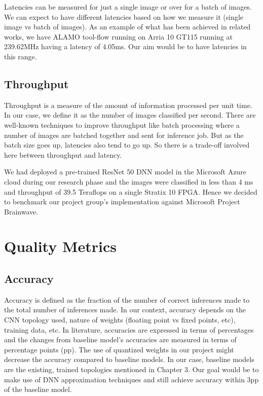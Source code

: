 \documentclass[titlepage]{report}
\begin{document}
Latencies can be measured for just a single image or over for a batch of images. We can expect to have different latencies based on how we measure it (single image vs batch of images). As an example of what has been achieved in related works, we have ALAMO tool-flow running on Arria 10 GT115 running at 239.62MHz having a latency of 4.05ms.
Our aim would be to have latencies in this range.

\subsection{Throughput}
Throughput is a measure of the amount of information processed per unit time. In our case, we define it as the number of images classified per second.  There are well-known techniques to improve throughput like batch processing where a number of images are batched together and sent for inference job. 
But as the batch size goes up, latencies also tend to go up. So there is a trade-off involved here between throughput and latency.  \par
We had deployed a pre-trained ResNet 50 DNN model in the Microsoft Azure cloud during our research phase and the images were classified in less than 4 ms and throughput of 39.5 Teraflops on a single Stratix 10 FPGA. Hence we decided to benchmark our project group's implementation against Microsoft Project Brainwave.



\section{Quality Metrics}
\subsection{Accuracy}
Accuracy is defined as the fraction of the number of correct inferences made to the total number of inferences made. In our context, accuracy depends on the CNN topology used, nature of weights (floating point vs fixed points, etc), training data, etc. 
In literature, accuracies are expressed in terms of percentages and the changes from baseline model's accuracies are measured in terms of percentage points (pp). 
The use of quantized weights in our project might decrease the accuracy compared to baseline models. In our case, baseline models are the existing, trained topologies mentioned in Chapter 3. Our goal would be to make use of DNN approximation techniques and still achieve accuracy within 3pp of the baseline model.
\end{document}
